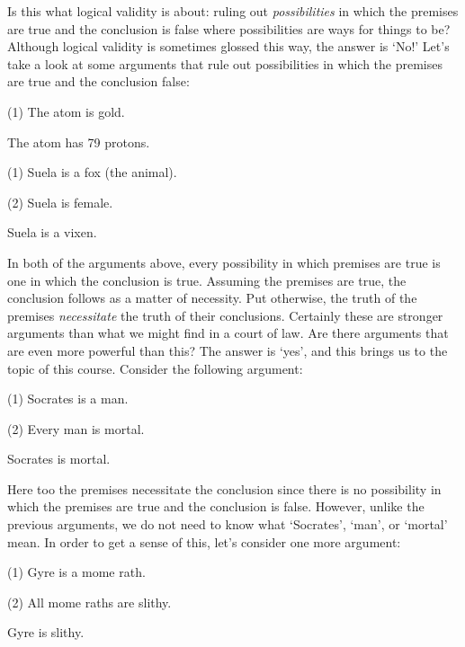 Is this what logical validity is about: ruling out \textit{possibilities} in which the premises are true and the conclusion is false where possibilities are ways for things to be?
Although logical validity is sometimes glossed this way, the answer is `No!'
Let's take a look at some arguments that rule out possibilities in which the premises are true and the conclusion false:

\begin{earg}
  \item[(1)] The atom is gold.
  \item[\therefore] The atom has 79 protons.
\end{earg}


\begin{earg}
  \item[(1)] Suela is a fox (the animal).
  \item[(2)] Suela is female.
  \item[\therefore] Suela is a vixen.
\end{earg}

In both of the arguments above, every possibility in which premises are true is one in which the conclusion is true.
Assuming the premises are true, the conclusion follows as a matter of necessity.
Put otherwise, the truth of the premises \emph{necessitate} the truth of their conclusions.
Certainly these are stronger arguments than what we might find in a court of law.
Are there arguments that are even more powerful than this?
The answer is `yes', and this brings us to the topic of this course.
Consider the following argument:

\begin{earg}
  \item[(1)] Socrates is a man.
  \item[(2)] Every man is mortal.
  \item[\therefore] Socrates is mortal.
\end{earg}

Here too the premises necessitate the conclusion since there is no possibility in which the premises are true and the conclusion is false.
However, unlike the previous arguments, we do not need to know what `Socrates', `man', or `mortal' mean.
In order to get a sense of this, let's consider one more argument:

\begin{earg}
  \item[(1)] Gyre is a mome rath.
  \item[(2)] All mome raths are slithy.
  \item[\therefore] Gyre is slithy.
\end{earg}

